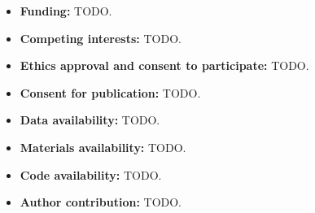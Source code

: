 \documentclass[pdflatex,sn-mathphys-num]{sn-jnl}
\theoremstyle{thmstylethree}%
\begin{document}
\begin{itemize}
\item \textbf{Funding:} TODO.
\item \textbf{Competing interests:} TODO.
\item \textbf{Ethics approval and consent to participate:} TODO.
\item \textbf{Consent for publication:} TODO.
\item \textbf{Data availability:} TODO.
\item \textbf{Materials availability:} TODO.
\item \textbf{Code availability:} TODO.
\item \textbf{Author contribution:} TODO.
\end{itemize}

\end{document}
